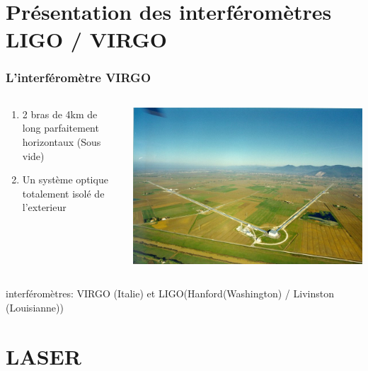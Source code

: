 \documentclass{beamer}
\begin{document}
\section{Présentation des interféromètres LIGO / VIRGO}
\begin{frame}
	\frametitle{L'interféromètre VIRGO}
	\begin{columns}
		\begin{column}{0.5\textwidth}
			\small
			\begin{enumerate}[-]
				\item 2 bras de 4km de long parfaitement horizontaux (Sous vide)
				\item Un système optique  totalement isolé de l'exterieur
			\end{enumerate}
		\end{column}
		\begin{column}{0.5\textwidth}
			\includegraphics[scale=.5]{Docs/virgoview.png}
		\end{column}
	\end{columns}
	 interféromètres: VIRGO (Italie) et LIGO(Hanford(Washington) / Livinston (Louisianne))
\end{frame}
\section{LASER}
\end{document}
